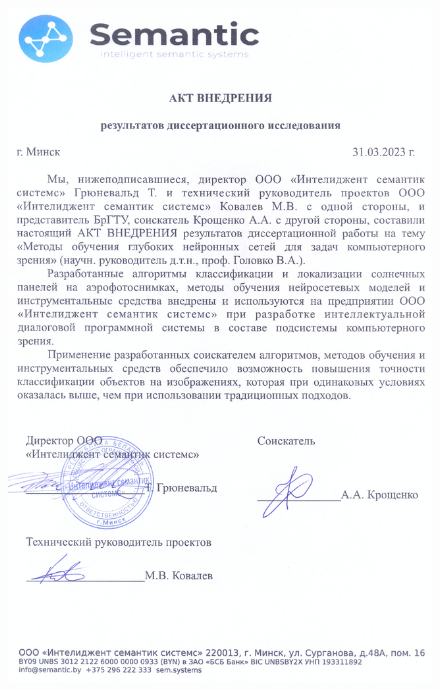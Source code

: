 \begin{figure}[ht]
	\centering
	\includegraphics[width=17cm]{man-source/images/appendix/appendixActs/act_ISS-2.jpg}
\end{figure}
